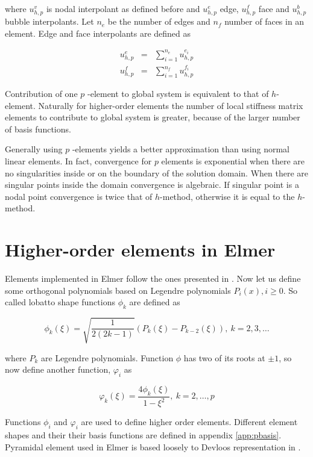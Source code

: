 \noindent where $u_{h,p}^v$ is nodal interpolant as defined before and $u_{h,p}^e$ edge, $u_{h,p}^f$ face and $u_{h,p}^b$ bubble interpolants. Let $n_e$ be the number of edges and $n_f$ number of faces in an element. Edge and face interpolants are defined as

\begin{eqnarray*}
u_{h,p}^e &=& \sum_{i=1}^{n_e} u_{h,p}^{e_i} \\
u_{h,p}^f &=& \sum_{i=1}^{n_f} u_{h,p}^{f_i}
\end{eqnarray*} 

Contribution of one $p$ -element to global system is equivalent to that of $h$-element. Naturally for higher-order elements the number of local stiffness matrix elements to contribute to global system is greater, because of the larger number of basis functions.  

Generally using $p$ -elements yields a better approximation than using normal linear elements. In fact, convergence for $p$ elements is exponential when there are no singularities inside or on the boundary of the solution domain. When there are singular points inside the domain convergence is algebraic. If singular point is a nodal point convergence is twice that of $h$-method, otherwise it is equal to the $h$-method.

\section{Higher-order elements in Elmer}

Elements implemented in Elmer follow the ones presented in \cite{SzaboBabu}. Now let us define some orthogonal polynomials based on Legendre polynomials $P_i(x), i\geq 0$. So called lobatto shape functions $\phi_k$ are defined as 

\begin{equation}
\phi_k(\xi)=\sqrt{\frac{1}{2(2k-1)}}(P_{k}(\xi)-P_{k-2}(\xi)),\
k=2,3,\ldots 
\end{equation}

\noindent where $P_k$ are Legendre polynomials. Function $\phi$ has two of its roots at $\pm 1$, so now define another function, $\varphi_i$ as

\begin{equation}
\varphi_k(\xi)=\frac{4\phi_k(\xi)}{1-\xi^2},\ k=2,\ldots,p
\end{equation}

\noindent Functions $\phi_i$ and $\varphi_i$ are used to define higher order elements. Different element shapes and their their basis functions are defined in appendix \ref{app:pbasis}. Pyramidal element used in Elmer is based loosely to Devloos representation in \cite{Devloo}. 

